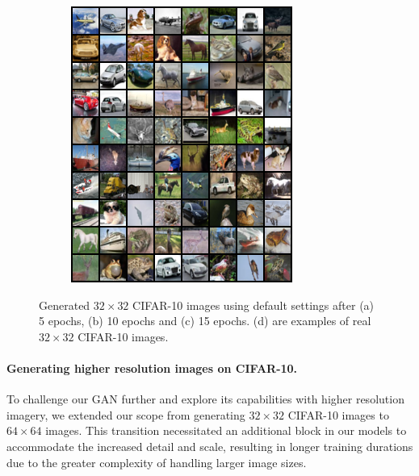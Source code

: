 \begin{figure}[H]
\begin{subfigure}{0.2\textwidth}
        \centering
        \includegraphics[width=0.95\linewidth]{cifar10/32/real_sample_epoch_0015.png}
        \caption{}
        \label{subfig:cifar10/32/real_sample_epoch_0015}
    \end{subfigure}%

    \caption{Generated $32 \times 32$ CIFAR-10 images using default settings after (a) 5 epochs, (b) 10 epochs and (c) 15 epochs. (d) are examples of real $32 \times 32$ CIFAR-10 images.}
    \label{fig:cifar10_32_images}
\end{figure}

\paragraph*{Generating higher resolution images on CIFAR-10.}

To challenge our GAN further and explore its capabilities with higher resolution imagery, we extended our scope from generating $32 \times 32$ CIFAR-10 images to $64 \times 64$ images. This transition necessitated an additional block in our models to accommodate the increased detail and scale, resulting in longer training durations due to the greater complexity of handling larger image sizes.

